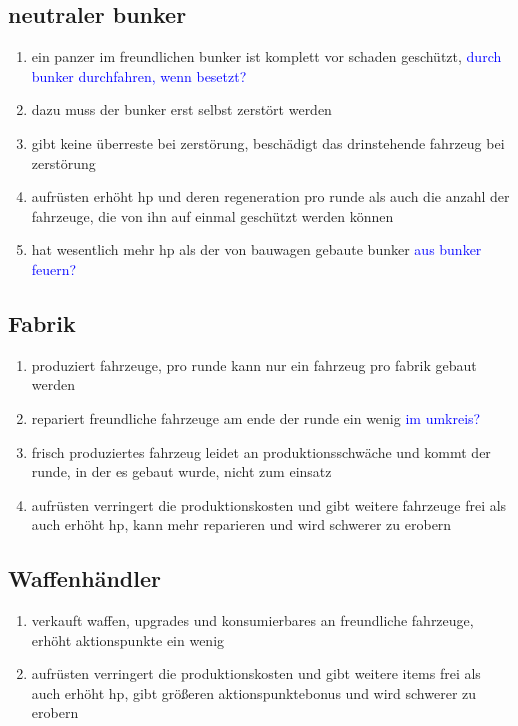 \documentclass[10pt,a4paper,final]{scrartcl}
\newcommand{\notiz}[1]{\textcolor{blue}{#1}}
\begin{document}
\subsection{neutraler bunker}
\begin{enumerate}
\item ein panzer im freundlichen bunker ist komplett vor schaden geschützt,  \notiz{durch bunker durchfahren, wenn besetzt?}
\item dazu muss der bunker erst selbst zerstört werden
\item gibt keine überreste bei zerstörung, beschädigt das drinstehende fahrzeug bei zerstörung
\item aufrüsten erhöht hp und deren regeneration pro runde als auch die anzahl der fahrzeuge, 
die von ihn auf einmal geschützt werden können
\item hat wesentlich mehr hp als der von bauwagen gebaute bunker \notiz{aus bunker feuern?}
\end{enumerate}

\subsection{Fabrik}
\begin{enumerate}
\item produziert fahrzeuge, pro runde kann nur ein fahrzeug pro fabrik gebaut werden
\item repariert freundliche fahrzeuge am ende der runde ein wenig \notiz{im umkreis?}
\item frisch produziertes fahrzeug leidet an produktionsschwäche und kommt der runde, in der es gebaut wurde, 
nicht zum einsatz
\item aufrüsten verringert die produktionskosten und gibt weitere fahrzeuge frei als auch erhöht hp, kann mehr reparieren
und wird schwerer zu erobern
\end{enumerate}

\subsection{Waffenhändler}
\begin{enumerate}
\item verkauft waffen, upgrades und konsumierbares an freundliche fahrzeuge, erhöht aktionspunkte ein wenig
\item aufrüsten verringert die produktionskosten und gibt weitere items frei als auch erhöht hp, gibt größeren 
aktionspunktebonus und wird schwerer zu erobern
\end{enumerate}
\end{document}
